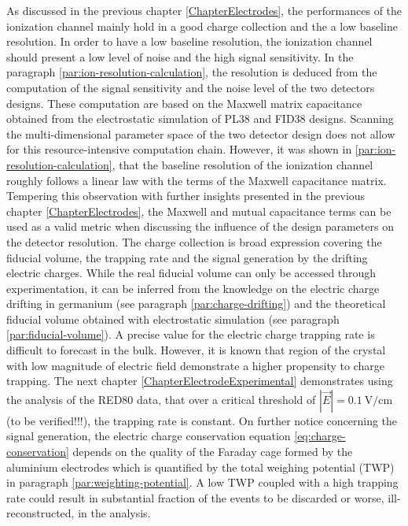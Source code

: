 As discussed in the previous chapter \ref{ChapterElectrodes}, the performances of the ionization channel mainly hold in a good charge collection and the a low baseline resolution.
In order to have a low baseline resolution, the ionization channel should present a low level of noise and the high signal sensitivity. In the paragraph \ref{par:ion-resolution-calculation}, the resolution is deduced from the computation of the signal sensitivity and the noise level of the two detectors designs. These computation are based on the Maxwell matrix capacitance obtained from the electrostatic simulation of PL38 and FID38 designs. Scanning the multi-dimensional parameter space of the two detector design does not allow for this resource-intensive computation chain. However, it was shown in \ref{par:ion-resolution-calculation}, that the baseline resolution of the ionization channel roughly follows a linear law with the terms of the Maxwell capacitance matrix. Tempering this observation with further insights presented in the previous chapter \ref{ChapterElectrodes}, the Maxwell and mutual capacitance terms can be used as a valid metric when discussing the influence of the design parameters on the detector resolution.
The charge collection is broad expression covering the fiducial volume, the trapping rate and the signal generation by the drifting electric charges. While the real fiducial volume can only be accessed through experimentation, it can be inferred from the knowledge on the electric charge drifting in germanium (see paragraph \ref{par:charge-drifting}) and the theoretical fiducial volume obtained with electrostatic simulation (see paragraph \ref{par:fiducial-volume}).
A precise value for the electric charge trapping rate is difficult to forecast in the bulk. However, it is known that region of the crystal with low magnitude of electric field demonstrate a higher propensity to charge trapping. The next chapter \ref{ChapterElectrodeExperimental} demonstrates using the analysis of the RED80 data, that over a critical threshold of $|\vec{E}|=\SI{0.1}{\volt\per\centi\meter}$ (to be verified!!!), the trapping rate is constant. %
On further notice concerning the signal generation, the electric charge conservation equation \ref{eq:charge-conservation} depends on the quality of the Faraday cage formed by the aluminium electrodes which is quantified by the total weighing potential (TWP) in paragraph \ref{par:weighting-potential}. A low TWP coupled with a high trapping rate could result in substantial fraction of the events to be discarded or worse, ill-reconstructed, in the analysis.

